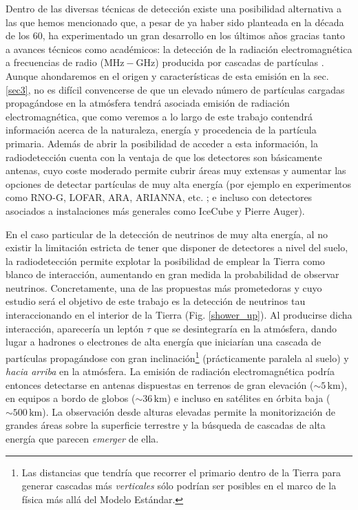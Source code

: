 \documentclass[12 pt, a4paper]{article} %
\numberwithin{equation}{section}
\numberwithin{figure}{section}
\numberwithin{table}{section}
\begin{document}
	Dentro de las diversas técnicas de detección existe una posibilidad alternativa a las que hemos mencionado que, a pesar de ya haber sido planteada en la década de los 60, ha experimentado un gran desarrollo en los últimos años gracias tanto a avances técnicos como académicos: la detección de la radiación electromagnética a frecuencias de radio ($\mathrm{MHz-GHz}$) producida por cascadas de partículas \cite{schroder2017radio}. Aunque ahondaremos en el origen y características de esta emisión en la sec. \ref{sec3}, no es difícil convencerse de que un elevado número de partículas cargadas propagándose en la atmósfera tendrá asociada emisión de radiación electromagnética, que como veremos a lo largo de este trabajo contendrá información acerca de la naturaleza, energía y procedencia de la partícula primaria. Además de abrir la posibilidad de acceder a esta información, la radiodetección cuenta con la ventaja de que los detectores son básicamente antenas, cuyo coste moderado permite cubrir áreas muy extensas y aumentar las opciones de detectar partículas de muy alta energía (por ejemplo en experimentos como RNO-G, LOFAR, ARA, ARIANNA, etc. \cite{schroder2017radio}; e incluso con detectores asociados a instalaciones más generales como IceCube y Pierre Auger).
	
	En el caso particular de la detección de neutrinos de muy alta energía, al no existir la limitación estricta de tener que disponer de detectores a nivel del suelo, la radiodetección permite explotar la posibilidad de emplear la Tierra como blanco de interacción, aumentando en gran medida la probabilidad de observar neutrinos. Concretamente, una de las propuestas más prometedoras y cuyo estudio será el objetivo de este trabajo es la detección de neutrinos tau interaccionando en el interior de la Tierra (Fig. \ref{shower_up}). Al producirse dicha interacción, aparecería un leptón $\tau$ que se desintegraría  en la atmósfera, dando lugar a hadrones o electrones de alta energía que iniciarían una cascada de partículas propagándose con gran inclinación\footnote{ Las distancias que tendría que recorrer el primario dentro de la Tierra para generar cascadas más \textit{verticales} sólo podrían ser posibles en el marco de la física más allá del Modelo Estándar.} (prácticamente paralela al suelo) y \textit{hacia arriba} en la atmósfera. La emisión de radiación electromagnética podría entonces detectarse en antenas dispuestas en terrenos de gran elevación ($\sim 5\,\mathrm{km}$), en equipos a bordo de globos ($\sim 36\,\mathrm{km}$) e incluso en satélites en órbita baja ($\sim 500\,\mathrm{km}$). La observación desde alturas elevadas permite la monitorización de grandes áreas sobre la superficie terrestre y la búsqueda de cascadas de alta energía que parecen \textit{emerger} de ella.
\end{document}
